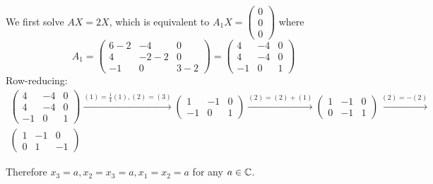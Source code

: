 \documentclass[a4paper, 10pt]{article}
\begin{document}
\begin{solution}
    We first solve \(AX = 2X\), which is equivalent to \(A_1X = \begin{pmatrix}
            0 \\
            0 \\
            0
        \end{pmatrix}\) where \[
        A_1 = \begin{pmatrix}
                6 -2 & -4    & 0   \\
                4    & -2 -2 & 0   \\
                -1   & 0     & 3-2
            \end{pmatrix} = \begin{pmatrix}
                4  & -4 & 0 \\
                4  & -4 & 0 \\
                -1 & 0  & 1
            \end{pmatrix}
    \]
    Row-reducing:
    \begin{multline*}
        \begin{pmatrix}
                4  & -4 & 0 \\
                4  & -4 & 0 \\
                -1 & 0  & 1
            \end{pmatrix} \xrightarrow{(1) = \frac{1}{4}(1),(2) = (3)}
        \begin{pmatrix}
                1  & -1 & 0 \\
                -1 & 0  & 1
            \end{pmatrix} \xrightarrow{(2) = (2) + (1)}
        \begin{pmatrix}
                1 & -1 & 0 \\
                0 & -1 & 1
            \end{pmatrix} \xrightarrow{(2) = -(2)}
        \\
        \begin{pmatrix}
                1 & -1 & 0  \\
                0 & 1  & -1
            \end{pmatrix}
    \end{multline*}

    Therefore \(x_3 = a, x_2 = x_3 = a, x_1 = x_2 = a\) for any \(a \in \mathbb{C}\).


\end{solution}
\end{document}
